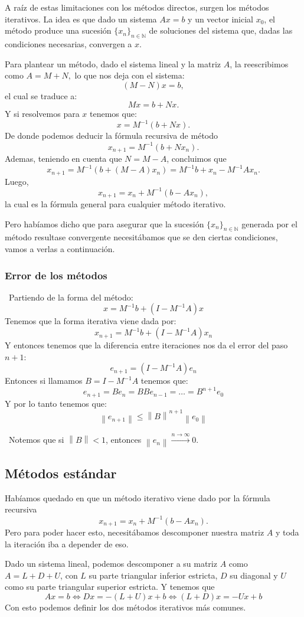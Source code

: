 \documentclass[12pt, oneside]{book}
\newcommand{\norm}[1]{\left\lVert#1\right\rVert}
\begin{document}
A raíz de estas limitaciones con los métodos directos, surgen los métodos iterativos. La idea es que dado un sistema $Ax = b$ y un vector inicial $x_0$, el método produce una sucesión $\{x_n\}_{n \in \mathbb{N}}$ de soluciones del sistema que, dadas las condiciones necesarias, convergen a $x$.

Para plantear un método, dado el sistema lineal y la matriz $A$, la reescribimos como $A=M+N,$ lo que nos deja con el sistema: $$(M-N)x=b,$$ 
el cual se traduce a: $$Mx=b+Nx.$$
Y si resolvemos para $x$ tenemos que: $$x=M^{-1}(b+Nx).$$ 
De donde podemos deducir la fórmula recursiva de método $$x_{n+1}=M^{-1}(b+Nx_{n}).$$
Ademas, teniendo en cuenta que $N=M-A$, concluimos que $$x_{n+1}=M^{-1}(b+(M-A)x_{n})=M^{-1}b+x_n-M^{-1}Ax_n.$$ 
Luego, $$x_{n+1}=x_n+M^{-1}(b-Ax_n),$$ 
la cual es la fórmula general para cualquier método iterativo.

Pero habíamos dicho que para asegurar que la sucesión $\{x_n\}_{n \in \mathbb{N}}$ generada por el método resultase convergente necesitábamos que se den ciertas condiciones, vamos a verlas a continuación.

\subsubsection{Error de los métodos}
\ Partiendo de la forma del método: $$x=M^{-1}b+(I-M^{-1}A)x$$ Tenemos que la forma iterativa viene dada por: $$x_{n+1}=M^{-1}b+(I-M^{-1}A)x_n$$ Y entonces tenemos que la diferencia entre iteraciones nos da el error del paso $n+1$: $$e_{n+1}=(I-M^{-1}A)e_n$$ Entonces si llamamos $B=I-M^{-1}A$ tenemos que: $$e_{n+1}=Be_n=BBe_{n-1}=\dots=B^{n+1}e_0$$ Y por lo tanto tenemos que: $$\norm{e_{n+1}} \leq \norm{B}^{n+1}\norm{e_0}$$

\ Notemos que si $\norm{B}<1$, entonces $\norm{e_n}\xrightarrow{n \xrightarrow{} \infty}0$.


\subsection{Métodos estándar}
Habíamos quedado en que un método iterativo viene dado por la fórmula recursiva $$x_{n+1}=x_n+M^{-1}(b-Ax_n).$$ Pero para poder hacer esto, necesitábamos descomponer nuestra matriz $A$ y toda la iteración iba a depender de eso.

Dado un sistema lineal, podemos descomponer a su matriz $A$ como $A=L+D+U$, con $L$ su parte triangular inferior estricta, $D$ su diagonal y $U$ como su parte triangular superior estricta. Y tenemos que $$Ax=b \iff Dx=-(L+U)x+b \iff (L+D)x=-Ux+b$$ Con esto podemos definir los dos métodos iterativos más comunes.
\end{document}
